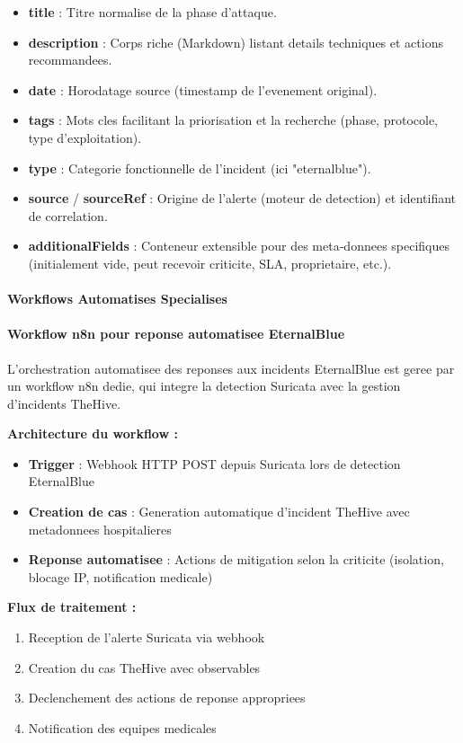 \begin{itemize}
  \item \textbf{title} : Titre normalise de la phase d'attaque.
  \item \textbf{description} : Corps riche (Markdown) listant details techniques et actions recommandees.
  \item \textbf{date} : Horodatage source (timestamp de l'evenement original).
  \item \textbf{tags} : Mots cles facilitant la priorisation et la recherche (phase, protocole, type d'exploitation).
  \item \textbf{type} : Categorie fonctionnelle de l'incident (ici "eternalblue").
  \item \textbf{source} / \textbf{sourceRef} : Origine de l'alerte (moteur de detection) et identifiant de correlation.
  \item \textbf{additionalFields} : Conteneur extensible pour des meta‑donnees specifiques (initialement vide, peut recevoir criticite, SLA, proprietaire, etc.).
\end{itemize}

\paragraph{Workflows Automatises Specialises}

\paragraph{Workflow n8n pour reponse automatisee EternalBlue}

L'orchestration automatisee des reponses aux incidents EternalBlue est geree par un workflow n8n dedie, qui integre la detection Suricata avec la gestion d'incidents TheHive.


\textbf{Architecture du workflow :}
\begin{itemize}
  \item \textbf{Trigger} : Webhook HTTP POST depuis Suricata lors de detection EternalBlue
  \item \textbf{Creation de cas} : Generation automatique d'incident TheHive avec metadonnees hospitalieres
  \item \textbf{Reponse automatisee} : Actions de mitigation selon la criticite (isolation, blocage IP, notification medicale)
\end{itemize}

\textbf{Flux de traitement :}
\begin{enumerate}
  \item Reception de l'alerte Suricata via webhook
  \item Creation du cas TheHive avec observables
  \item Declenchement des actions de reponse appropriees
  \item Notification des equipes medicales
\end{enumerate}

